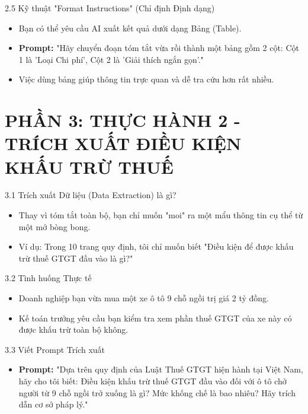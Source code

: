 \documentclass[aspectratio=169]{beamer}
\begin{document}
\begin{frame}{2.5 Kỹ thuật "Format Instructions" (Chỉ định Định dạng)}
    \begin{itemize}
        \item Bạn có thể yêu cầu AI xuất kết quả dưới dạng Bảng (Table).
        \item \textbf{Prompt:} "Hãy chuyển đoạn tóm tắt vừa rồi thành một bảng gồm 2 cột: Cột 1 là 'Loại Chi phí', Cột 2 là 'Giải thích ngắn gọn'."
        \item Việc dùng bảng giúp thông tin trực quan và dễ tra cứu hơn rất nhiều.
    \end{itemize}
\end{frame}


\section{PHẦN 3: THỰC HÀNH 2 - TRÍCH XUẤT ĐIỀU KIỆN KHẤU TRỪ THUẾ}


\begin{frame}{3.1 Trích xuất Dữ liệu (Data Extraction) là gì?}
    \begin{itemize}
        \item Thay vì tóm tắt toàn bộ, bạn chỉ muốn "moi" ra một mẩu thông tin cụ thể từ một mớ bòng bong.
        \item Ví dụ: Trong 10 trang quy định, tôi chỉ muốn biết "Điều kiện để được khấu trừ thuế GTGT đầu vào là gì?"
    \end{itemize}
\end{frame}


\begin{frame}{3.2 Tình huống Thực tế}
    \begin{itemize}
        \item Doanh nghiệp bạn vừa mua một xe ô tô 9 chỗ ngồi trị giá 2 tỷ đồng.
        \item Kế toán trưởng yêu cầu bạn kiểm tra xem phần thuế GTGT của xe này có được khấu trừ toàn bộ không.
    \end{itemize}
\end{frame}


\begin{frame}{3.3 Viết Prompt Trích xuất}
    \begin{itemize}
        \item \textbf{Prompt:} "Dựa trên quy định của Luật Thuế GTGT hiện hành tại Việt Nam, hãy cho tôi biết: Điều kiện khấu trừ thuế GTGT đầu vào đối với ô tô chở người từ 9 chỗ ngồi trở xuống là gì? Mức khống chế là bao nhiêu? Hãy trích dẫn cơ sở pháp lý."
    \end{itemize}
\end{frame}
\end{document}
